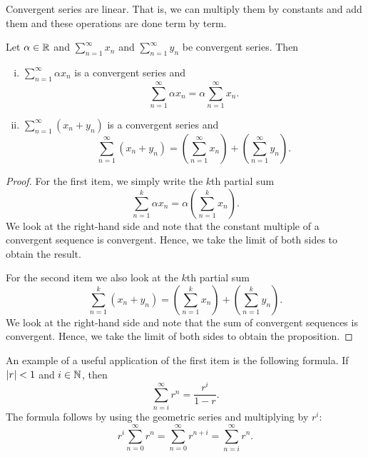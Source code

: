 Convergent series are linear.  That is, we can multiply them by constants
and add them and these operations are done term by term.

\begin{prop}
Let $\alpha \in {\mathbb{R}}$ and $\sum_{n=1}^\infty x_n$ and $\sum_{n=1}^\infty y_n$ be
convergent series.  Then
\begin{enumerate}[(i)]
\item
$\sum_{n=1}^\infty \alpha x_n$ is a convergent series and
\begin{equation*}
\sum_{n=1}^\infty \alpha x_n
=
\alpha \sum_{n=1}^\infty x_n .
\end{equation*}
\item
$\sum_{n=1}^\infty ( x_n + y_n )$ is a convergent series and
\begin{equation*}
\sum_{n=1}^\infty ( x_n + y_n ) 
=
\left( \sum_{n=1}^\infty x_n \right)
+
\left( \sum_{n=1}^\infty y_n \right) .
\end{equation*}
\end{enumerate}
\end{prop}

\begin{proof}
For the first item,
we simply write the $k$th partial sum
\begin{equation*}
\sum_{n=1}^k \alpha x_n
=
\alpha \left( \sum_{n=1}^k x_n \right) .
\end{equation*}
We look at the right-hand side and note that the constant multiple of
a convergent sequence
is convergent.  Hence, we take the limit of both sides to obtain
the result.

For the second item we also look at the
$k$th partial sum
\begin{equation*}
\sum_{n=1}^k ( x_n + y_n ) 
=
\left( \sum_{n=1}^k x_n \right)
+
\left( \sum_{n=1}^k y_n \right) .
\end{equation*}
We look at the right-hand side and note that the sum of convergent sequences
is convergent.  Hence, we take the limit of both sides to obtain
the proposition.
\end{proof}

An example of a useful application of the first item is the following
formula.  If $\left\lvert {r} \right\rvert < 1$ and $i \in {\mathbb{N}}$, then
\begin{equation*}
\sum_{n=i}^\infty r^n = \frac{r^i}{1-r} .
\end{equation*}
The formula follows by using the geometric series and multiplying by
$r^i$:
\begin{equation*}
r^i \sum_{n=0}^\infty r^n =
\sum_{n=0}^\infty r^{n+i}
=
\sum_{n=i}^\infty r^n .
\end{equation*}

